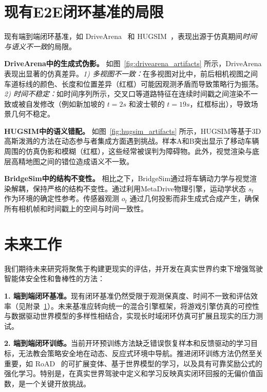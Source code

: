 \documentclass{article}
\begin{document}
\section{现有E2E闭环基准的局限}
\label{appendix:current_e2e_bottlenecks}

现有端到端闭环基准，如 DriveArena~\cite{yang2024drivearena} 和 HUGSIM~\cite{zhou2024hugsim}，表现出源于仿真期间\textit{时间与语义不一致}的局限。

\textbf{DriveArena中的生成式伪影。}
如图~\ref{fig:drivearena_artifacts} 所示，DriveArena表现出显著的仿真差异。\textit{1) 多视图不一致：}在多视图对比中，前后相机视图之间车道标线的颜色、长度和位置差异（红框）可能因观测矛盾而导致策略行为振荡。\textit{2) 时间不稳定：}如时间序列所示，交叉口等道路特征在连续时间戳之间渲染不一致或被自发修改（例如新加坡的 $t=2s$ 和波士顿的 $t=19s$，红框标出），导致场景几何不稳定。

\textbf{HUGSIM中的语义错配。}
如图~\ref{fig:hugsim_artifacts} 所示，HUGSIM等基于3D高斯泼溅的方法在动态参与者集成方面遇到挑战。样本A和B突出显示了移动车辆周围的仿真伪影和模糊（红框），这些经常被误判为障碍物。此外，视觉渲染与底层高精地图之间的错位造成语义不一致。

\textbf{BridgeSim中的结构不变性。}
相比之下，BridgeSim通过将车辆动力学与视觉渲染解耦，保持严格的结构不变性。通过利用MetaDrive物理引擎，运动学状态 $s_t$ 作为环境的确定性参考。传感器观测 $o_t$ 通过几何投影而非生成式合成产生，确保所有相机帧和时间戳上的空间与时间一致性。

\section{未来工作}
我们期待未来研究将聚焦于构建更现实的评估，并开发在真实世界约束下增强驾驶智能体安全性和鲁棒性的方法：

\textbf{1. 端到端闭环基准。}现有闭环基准仍然受限于观测保真度、时间不一致和评估效率（见附录~\ref{appendix:current_e2e_bottlenecks}）。未来基准应转向统一的混合引擎框架，将游戏引擎仿真的可控性与数据驱动世界模型的多样性相结合，实现长时域闭环仿真可扩展且现实的压力测试。

\textbf{2. 端到端闭环训练。}当前开环预训练方法缺乏错误恢复样本和反馈驱动的学习目标，无法教会策略安全地在动态、反应式环境中导航。推进闭环训练方法仍然至关重要，如 RoAD~\cite{garcia2025road} 的可扩展变体、基于世界模型的学习，以及具有可靠奖励公式的强化学习。特别是，在真实世界驾驶中定义和学习反映真实闭环回报的无偏价值函数，是一个关键开放挑战。
\end{document}
